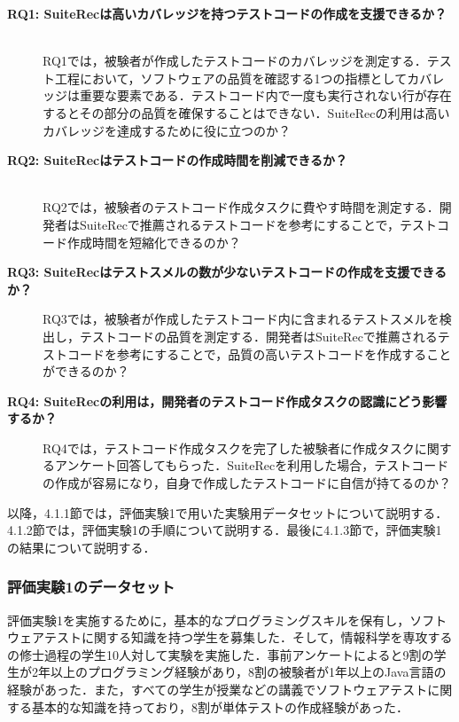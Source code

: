 \documentclass[12pt]{jarticle} %
\begin{document}
\begin{description}
\item[\textbf{RQ1: {\sf SuiteRec}は高いカバレッジを持つテストコードの作成を支援できるか？}]~\\
RQ1では，被験者が作成したテストコードのカバレッジを測定する．テスト工程において，ソフトウェアの品質を確認する1つの指標としてカバレッジは重要な要素である．テストコード内で一度も実行されない行が存在するとその部分の品質を確保することはできない．{\sf SuiteRec}の利用は高いカバレッジを達成するために役に立つのか？
\item[\textbf{RQ2: {\sf SuiteRec}はテストコードの作成時間を削減できるか？}]~\\
RQ2では，被験者のテストコード作成タスクに費やす時間を測定する．開発者は{\sf SuiteRec}で推薦されるテストコードを参考にすることで，テストコード作成時間を短縮化できるのか？
\item[\textbf{RQ3: {\sf SuiteRec}はテストスメルの数が少ないテストコードの作成を支援できるか？}]
RQ3では，被験者が作成したテストコード内に含まれるテストスメルを検出し，テストコードの品質を測定する．開発者は{\sf SuiteRec}で推薦されるテストコードを参考にすることで，品質の高いテストコードを作成することができるのか？
\item[\textbf{RQ4: {\sf SuiteRec}の利用は，開発者のテストコード作成タスクの認識にどう影響するか？}]
RQ4では，テストコード作成タスクを完了した被験者に作成タスクに関するアンケート回答してもらった．{\sf SuiteRec}を利用した場合，テストコードの作成が容易になり，自身で作成したテストコードに自信が持てるのか？
\end{description}

以降，4.1.1節では，評価実験1で用いた実験用データセットについて説明する．4.1.2節では，評価実験1の手順について説明する．最後に4.1.3節で，評価実験1の結果について説明する．


\subsubsection{評価実験1のデータセット}

評価実験1を実施するために，基本的なプログラミングスキルを保有し，ソフトウェアテストに関する知識を持つ学生を募集した．そして，情報科学を専攻するの修士過程の学生10人対して実験を実施した．事前アンケートによると9割の学生が2年以上のプログラミング経験があり，8割の被験者が1年以上のJava言語の経験があった．また，すべての学生が授業などの講義でソフトウェアテストに関する基本的な知識を持っており，8割が単体テストの作成経験があった．
\end{document}
